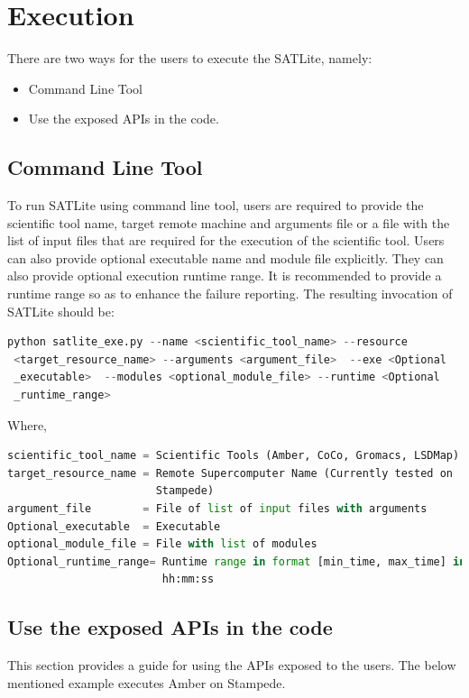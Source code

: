 \documentclass[10pt]{ruthesis}
\begin{document}
\section{Execution}
There are two ways for the users to execute the SATLite, namely:
\begin{itemize}
\item Command Line Tool
\item Use the exposed APIs in the code.
\end{itemize}

\subsection{Command Line Tool}
To run SATLite using command line tool, users are required to provide the scientific tool name, target remote machine and arguments file or a file with the list of input files that are required for the execution of the scientific tool. Users can also provide optional executable name and module file explicitly. They can also provide optional execution runtime range. It is recommended to provide a runtime range so as to enhance the failure reporting. The resulting invocation of SATLite should be:

\begin{lstlisting}[language=Python, linewidth=16cm]
 python satlite_exe.py --name <scientific_tool_name> --resource 
 <target_resource_name> --arguments <argument_file>  --exe <Optional
 _executable>  --modules <optional_module_file> --runtime <Optional
 _runtime_range>
\end{lstlisting}

Where,
\begin{lstlisting}[language=Python, linewidth=16cm]
scientific_tool_name = Scientific Tools (Amber, CoCo, Gromacs, LSDMap)
target_resource_name = Remote Supercomputer Name (Currently tested on 
                       Stampede)
argument_file        = File of list of input files with arguments
Optional_executable  = Executable
optional_module_file = File with list of modules
Optional_runtime_range= Runtime range in format [min_time, max_time] in
                        hh:mm:ss
\end{lstlisting}

\subsection{Use the exposed APIs in the code}
This section provides a guide for using the APIs exposed to the users. The below mentioned example executes Amber on Stampede.
\end{document}
